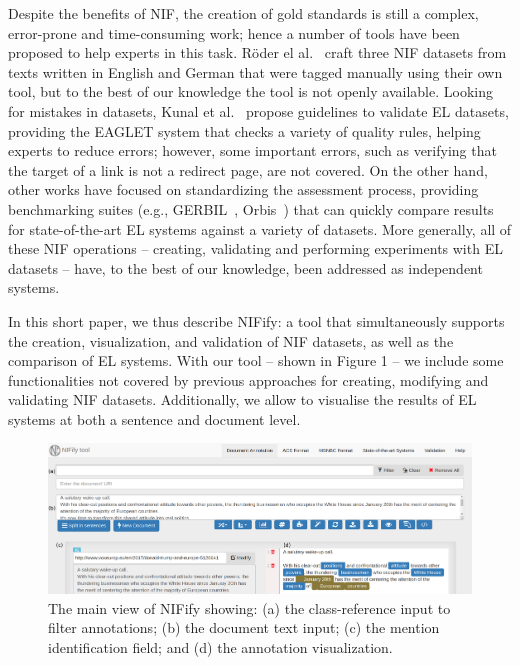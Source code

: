 \documentclass[sigconf]{acmart}
\begin{document}
Despite the benefits of NIF, the creation of gold standards is still a complex, error-prone and time-consuming work; hence a number of tools have been proposed to help experts in this task. R\"oder el al.~\cite{N3} craft three NIF datasets from texts written in English and German that were tagged manually using their own tool, but to the best of our knowledge the tool is not openly available. Looking for mistakes in datasets, Kunal et al.~\cite{Kunal2017} propose guidelines to validate EL datasets, providing the EAGLET system that checks a variety of quality rules, helping experts to reduce errors; however, some important errors, such as verifying that the target of a link is not a redirect page, are not covered. On the other hand, other works have focused on standardizing the assessment process, providing benchmarking suites (e.g., GERBIL~\cite{gerbil-2015}, Orbis~\cite{Orbis2018}) that can quickly compare results for state-of-the-art EL systems against a variety of datasets. More generally, all of these NIF operations -- creating, validating and performing experiments with EL datasets -- have, to the best of our knowledge, been addressed as independent systems. 

In this short paper, we thus describe NIFify: a tool that simultaneously supports the creation, visualization, and validation of NIF datasets, as well as the comparison of EL systems. With our tool -- shown in Figure 1 -- we include some functionalities not covered by previous approaches for creating, modifying and validating NIF datasets. Additionally, we allow to visualise the results of EL systems at both a sentence and document level. 


\begin{figure}[tb]
\label{fig:sys}
\includegraphics[width=1\textwidth]{figs/screenshot}
\caption{The main view of NIFify showing: (a) the class-reference input to filter annotations; (b) the document text input; (c) the mention identification field; and (d) the annotation visualization.}
\end{figure}
\end{document}

